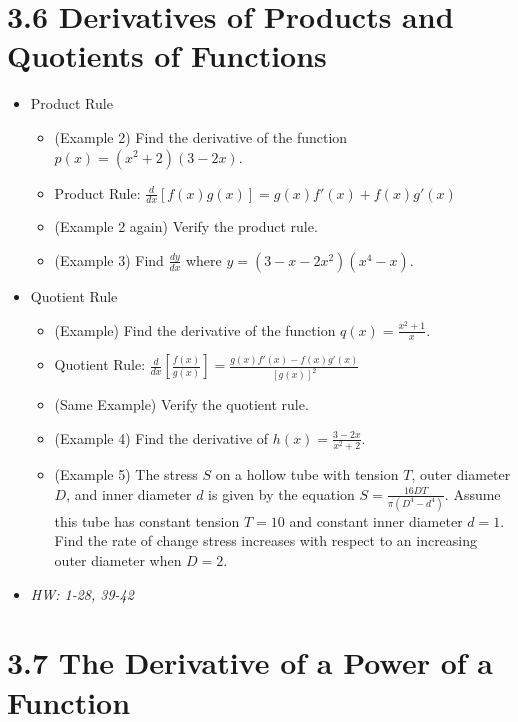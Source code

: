 \documentclass[11pt]{article}
\begin{document}
\section*{3.6 Derivatives of Products and Quotients of Functions}

\begin{itemize}
\item Product Rule
  \begin{itemize}
    \item (Example 2) Find the derivative of the function
          \(p(x)=(x^2+2)(3-2x)\).
    \item Product Rule:
          \(\frac{d}{dx}[f(x)g(x)]=g(x)f'(x)+f(x)g'(x)\)
    \item (Example 2 again) Verify the product rule.
    \item (Example 3) Find \(\frac{dy}{dx}\) where \(y=(3-x-2x^2)(x^4-x)\).
  \end{itemize}
\item Quotient Rule
  \begin{itemize}
    \item (Example) Find the derivative of the function
          \(q(x)=\frac{x^2+1}{x}\).
    \item Quotient Rule:
          \(\frac{d}{dx}[\frac{f(x)}{g(x)}]=\frac{g(x)f'(x)-f(x)g'(x)}{[g(x)]^2}\)
    \item (Same Example) Verify the quotient rule.
    \item (Example 4) Find the derivative of \(h(x)=\frac{3-2x}{x^2+2}\).
    \item (Example 5) The stress \(S\) on a hollow tube with tension \(T\),
          outer diameter \(D\), and inner diameter \(d\) is given by the
          equation \(S=\frac{16DT}{\pi(D^4-d^4)}\). Assume this tube has
          constant tension \(T=10\) and constant inner diameter \(d=1\).
          Find the rate of change
          stress increases with respect to an increasing outer diameter
          when \(D=2\).
  \end{itemize}
\item\textit{
  HW: 1-28, 39-42
}
\end{itemize}

\section*{3.7 The Derivative of a Power of a Function}
\end{document}
